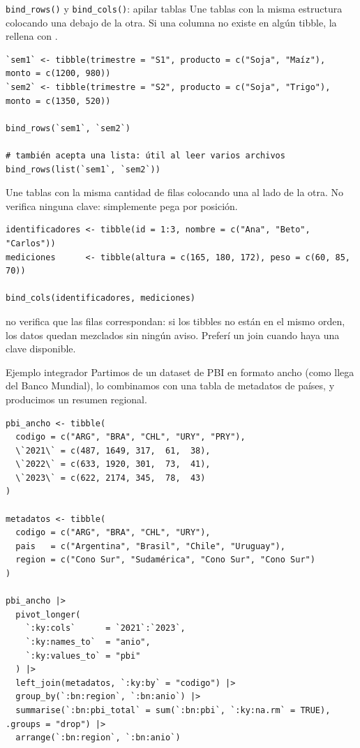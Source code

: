 \documentclass[8pt]{beamer}
\begin{document}
	\begin{frame}[fragile]{\texttt{bind\_rows()} y \texttt{bind\_cols()}: apilar tablas}
		Une tablas con la misma estructura colocando una debajo de la otra. Si una columna no existe en algún tibble, la rellena con .
\begin{lstlisting}[style=RScript]
`sem1` <- tibble(trimestre = "S1", producto = c("Soja", "Maíz"),  monto = c(1200, 980))
`sem2` <- tibble(trimestre = "S2", producto = c("Soja", "Trigo"), monto = c(1350, 520))

bind_rows(`sem1`, `sem2`)

# también acepta una lista: útil al leer varios archivos
bind_rows(list(`sem1`, `sem2`))
\end{lstlisting}

		Une tablas con la misma cantidad de filas colocando una al lado de la otra. No verifica ninguna clave: simplemente pega por posición.
\begin{lstlisting}[style=RScript]
identificadores <- tibble(id = 1:3, nombre = c("Ana", "Beto", "Carlos"))
mediciones      <- tibble(altura = c(165, 180, 172), peso = c(60, 85, 70))

bind_cols(identificadores, mediciones)
\end{lstlisting}

		\begin{alertblock}{}
			 no verifica que las filas correspondan: si los tibbles no están en el mismo orden, los datos quedan mezclados sin ningún aviso. Preferí un join cuando haya una clave disponible.
		\end{alertblock}
	\end{frame}


	\begin{frame}[fragile]{Ejemplo integrador}
		Partimos de un dataset de PBI en formato ancho (como llega del Banco Mundial), lo combinamos con una tabla de metadatos de países, y producimos un resumen regional.

\begin{lstlisting}[style=RScript]
pbi_ancho <- tibble(
  codigo = c("ARG", "BRA", "CHL", "URY", "PRY"),
  \`2021\` = c(487, 1649, 317,  61,  38),
  \`2022\` = c(633, 1920, 301,  73,  41),
  \`2023\` = c(622, 2174, 345,  78,  43)
)

metadatos <- tibble(
  codigo = c("ARG", "BRA", "CHL", "URY"),
  pais   = c("Argentina", "Brasil", "Chile", "Uruguay"),
  region = c("Cono Sur", "Sudamérica", "Cono Sur", "Cono Sur")
)

pbi_ancho |>
  pivot_longer(
    `:ky:cols`      = `2021`:`2023`,
    `:ky:names_to`  = "anio",
    `:ky:values_to` = "pbi"
  ) |>
  left_join(metadatos, `:ky:by` = "codigo") |>
  group_by(`:bn:region`, `:bn:anio`) |>
  summarise(`:bn:pbi_total` = sum(`:bn:pbi`, `:ky:na.rm` = TRUE), .groups = "drop") |>
  arrange(`:bn:region`, `:bn:anio`)
\end{lstlisting}
	\end{frame}
\end{document}

